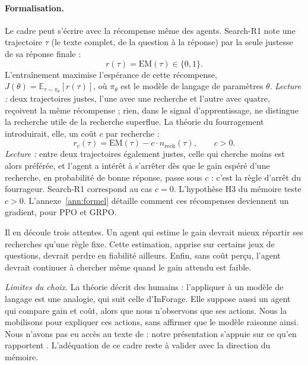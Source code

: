 \paragraph{Formalisation.} Le cadre peut s'écrire avec la récompense même des agents. Search-R1 note une trajectoire $\tau$ (le texte complet, de la question à la réponse) par la seule justesse de sa réponse finale \citep{jin2025search} :
\begin{equation}\label{eq:r-searchr1}
r(\tau) = \mathrm{EM}(\tau) \in \{0, 1\}.
\end{equation}
L'entraînement maximise l'espérance de cette récompense, $J(\theta) = \mathbb{E}_{\tau \sim \pi_\theta}[r(\tau)]$, où $\pi_\theta$ est le modèle de langage de paramètres $\theta$. \emph{Lecture :} deux trajectoires justes, l'une avec une recherche et l'autre avec quatre, reçoivent la même récompense ; rien, dans le signal d'apprentissage, ne distingue la recherche utile de la recherche superflue. La théorie du fourragement introduirait, elle, un coût $c$ par recherche :
\begin{equation}\label{eq:r-cout}
r_c(\tau) = \mathrm{EM}(\tau) - c \cdot n_{\text{rech}}(\tau), \qquad c > 0.
\end{equation}
\emph{Lecture :} entre deux trajectoires également justes, celle qui cherche moins est alors préférée, et l'agent a intérêt à s'arrêter dès que le gain espéré d'une recherche, en probabilité de bonne réponse, passe sous $c$ : c'est la règle d'arrêt du fourrageur. Search-R1 correspond au cas $c = 0$. L'hypothèse H3 du mémoire teste $c > 0$. L'annexe~\ref{ann:formel} détaille comment ces récompenses deviennent un gradient, pour PPO et GRPO.

Il en découle trois attentes. Un agent qui estime le gain devrait mieux répartir ses recherches qu'une règle fixe. Cette estimation, apprise sur certains jeux de questions, devrait perdre en fiabilité ailleurs. Enfin, sans coût perçu, l'agent devrait continuer à chercher même quand le gain attendu est faible.

\emph{Limites du choix.} La théorie décrit des humains : l'appliquer à un modèle de langage est une analogie, qui suit celle d'InForage. Elle suppose aussi un agent qui compare gain et coût, alors que nous n'observons que ses actions. Nous la mobilisons pour expliquer ces actions, sans affirmer que le modèle raisonne ainsi. Nous n'avons pas eu accès au texte de \citet{pirolli1999information} : notre présentation s'appuie sur ce qu'en rapportent \citet{qian2025scent}. L'adéquation de ce cadre reste à valider avec la direction du mémoire.

